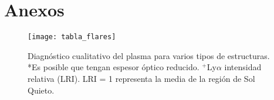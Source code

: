 \chapter{Anexos}

\begin{figure}[h]
\centering
\texttt{[image: tabla\_flares]}
\caption{ Diagn\'ostico cualitativo del plasma para varios tipos de estructuras.\newline
*Es posible que tengan espesor \'optico reducido. \newline
$^+$Ly$\alpha$ intensidad relativa (LRI). LRI = 1 representa la media de la regi\'on de Sol Quieto.}
\label{tabla_flares}
\end{figure}
